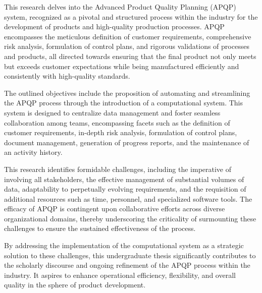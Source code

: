 This research delves into the Advanced Product Quality Planning (APQP) system, recognized as a pivotal and structured process within the industry for the development of products and high-quality production processes. APQP encompasses the meticulous definition of customer requirements, comprehensive risk analysis, formulation of control plans, and rigorous validations of processes and products, all directed towards ensuring that the final product not only meets but exceeds customer expectations while being manufactured efficiently and consistently with high-quality standards.

The outlined objectives include the proposition of automating and streamlining the APQP process through the introduction of a computational system. This system is designed to centralize data management and foster seamless collaboration among teams, encompassing facets such as the definition of customer requirements, in-depth risk analysis, formulation of control plans, document management, generation of progress reports, and the maintenance of an activity history.

This research identifies formidable challenges, including the imperative of involving all stakeholders, the effective management of substantial volumes of data, adaptability to perpetually evolving requirements, and the requisition of additional resources such as time, personnel, and specialized software tools. The efficacy of APQP is contingent upon collaborative efforts across diverse organizational domains, thereby underscoring the criticality of surmounting these challenges to ensure the sustained effectiveness of the process.

By addressing the implementation of the computational system as a strategic solution to these challenges, this undergraduate thesis significantly contributes to the scholarly discourse and ongoing refinement of the APQP process within the industry. It aspires to enhance operational efficiency, flexibility, and overall quality in the sphere of product development.



